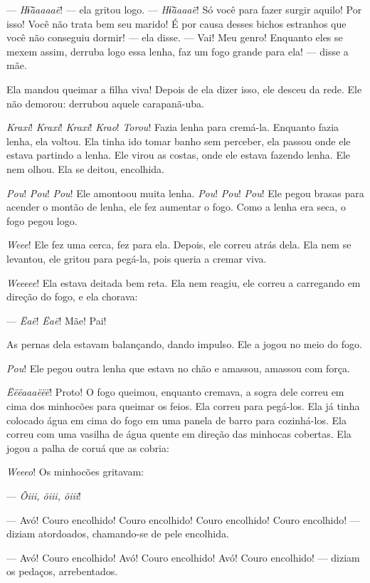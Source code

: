 --- \textit{Hɨ̃ãaaaaë}! --- ela gritou logo. --- \textit{Hɨ̃ãaaaë}! Só você para fazer surgir
aquilo! Por isso! Você não trata bem seu marido! É por causa desses
bichos estranhos que você não conseguiu dormir! --- ela disse. --- Vai! Meu
genro! Enquanto eles se mexem assim, derruba logo essa lenha, faz um fogo
grande para ela! --- disse a mãe. 

Ela mandou queimar a filha viva! Depois de ela dizer isso, ele desceu da
rede. Ele não demorou: derrubou aquele carapanã-uba.

\textit{Kraxi}! \textit{Kraxi}! \textit{Kraxi}! \textit{Krao}! \textit{Torou}! Fazia lenha para cremá-la. Enquanto
fazia lenha, ela voltou. Ela tinha ido tomar banho sem perceber, ela passou
onde ele estava partindo a lenha. Ele virou as costas, onde ele estava fazendo
lenha. Ele nem olhou. Ela se deitou, encolhida. 

\textit{Pou}! \textit{Pou}! \textit{Pou}! Ele amontoou muita lenha. \textit{Pou}! \textit{Pou}! \textit{Pou}! Ele pegou
brasas para acender o montão de lenha, ele fez aumentar o fogo. Como a
lenha era seca, o fogo pegou logo. 

\textit{Weee}! Ele fez uma cerca, fez para ela. Depois, ele correu atrás dela.
Ela nem se levantou, ele gritou para pegá-la, pois queria a cremar viva. 

\textit{Weeeee}! Ela estava deitada bem reta. Ela nem reagiu, ele correu a carregando
em direção do fogo, e ela chorava: 

--- \textit{Ëaë}! \textit{Ëaë}! Mãe! Pai! 

As pernas dela estavam balançando, dando impulso. Ele a jogou no meio
do fogo. 

\textit{Pou}! Ele pegou outra lenha que estava no chão e amassou, amassou com
força. 

\textit{Ëëëaaaëëë}! Proto! O fogo queimou, enquanto cremava, a sogra dele correu
em cima dos minhocões para queimar os feios. Ela correu para pegá-los.
Ela já tinha colocado água em cima do fogo em uma panela de barro para
cozinhá-los. Ela correu com uma vasilha de água quente em direção das
minhocas cobertas. Ela jogou a palha de coruá que as cobria: 

\textit{Weeeo}! Os minhocões gritavam:

--- \textit{Õiii, õiii, õiii}! 

--- Avó! Couro encolhido! Couro encolhido! Couro encolhido! Couro
encolhido! --- diziam atordoados, chamando-se de pele encolhida. 

--- Avó! Couro encolhido! Avó! Couro encolhido! Avó! Couro encolhido! ---
diziam os pedaços, arrebentados. 

